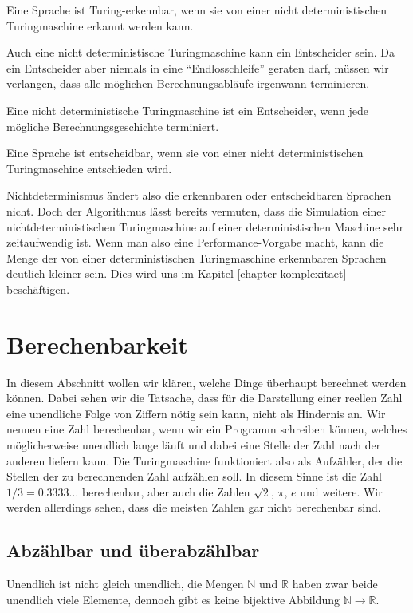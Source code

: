 \begin{satz}
Eine Sprache ist Turing-erkennbar, wenn sie von einer nicht deterministischen
Turingmaschine erkannt werden kann.
\end{satz}

Auch eine nicht deterministische Turingmaschine kann ein Entscheider sein.
Da ein Entscheider aber niemals in eine ``Endlosschleife'' geraten darf,
müssen wir verlangen, dass alle möglichen Berechnungsabläufe
irgenwann terminieren.

\begin{definition}
%
%
Eine nicht deterministische Turingmaschine ist ein Entscheider, wenn
jede mögliche Berechnungsgeschichte terminiert.
\end{definition}

\begin{satz}
Eine Sprache ist entscheidbar, wenn sie von einer nicht deterministischen
Turingmaschine entschieden wird.
\end{satz}

Nichtdeterminismus ändert also die erkennbaren oder entscheidbaren Sprachen
nicht. Doch der Algorithmus lässt bereits vermuten, dass die Simulation
einer nichtdeterministischen Turingmaschine auf einer deterministischen
Maschine sehr zeitaufwendig ist. Wenn man also eine Performance-Vorgabe
macht, kann die Menge der von einer deterministischen Turingmaschine
erkennbaren Sprachen deutlich kleiner sein. Dies wird uns im Kapitel
\ref{chapter-komplexitaet} beschäftigen.

\section{Berechenbarkeit}
In diesem Abschnitt wollen wir klären, welche Dinge überhaupt
berechnet werden können. Dabei sehen wir die Tatsache, dass für
die Darstellung einer reellen Zahl eine unendliche Folge von Ziffern
nötig sein kann, nicht als Hindernis an. Wir nennen eine Zahl
berechenbar, wenn wir ein Programm schreiben können, welches
möglicherweise unendlich lange läuft und dabei eine Stelle der
Zahl nach der anderen liefern kann. Die Turingmaschine
funktioniert also als Aufzähler, der die Stellen der zu berechnenden
Zahl aufzählen soll.  In diesem Sinne ist die
Zahl $1/3=0.3333\dots$ berechenbar, aber auch die Zahlen $\sqrt{2}$, $\pi$,
$e$ und weitere. Wir werden allerdings sehen, dass die meisten
Zahlen gar nicht berechenbar sind.

\subsection{Abzählbar und überabzählbar}
Unendlich ist nicht gleich unendlich, die Mengen $\mathbb N$ und
$\mathbb R$ haben zwar beide unendlich viele Elemente, dennoch
gibt es keine bijektive Abbildung $\mathbb N\to \mathbb R$.

